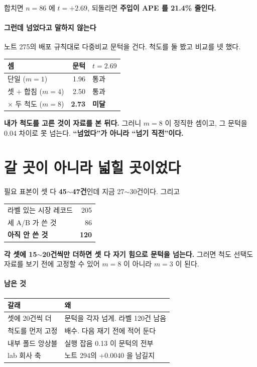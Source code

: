 \documentclass[10pt]{article}
\begin{document}
합치면 $n{=}86$ 에 $t{=}+2.69$, 되돌리면 \textbf{주입이 APE 를 21.4\% 줄인다.}

\paragraph{그런데 넘었다고 말하지 않는다} 노트 275의 배포 규칙대로 다중비교
문턱을 건다. 척도를 둘 봤고 비교를 넷 했다.

\begin{center}\small
\begin{tabular}{lrl}
\hline
셈 & 문턱 & $t{=}2.69$ \\
\hline
단일 ($m{=}1$) & 1.96 & 통과 \\
셋 $+$ 합침 ($m{=}4$) & 2.50 & 통과 \\
$\times$ 두 척도 ($m{=}8$) & \textbf{2.73} & \textbf{미달} \\
\hline
\end{tabular}
\end{center}

\textbf{내가 척도를 고른 것이 자료를 본 뒤다.} 그러니 $m{=}8$ 이 정직한
셈이고, 그 문턱을 0.04 차이로 못 넘는다. \textbf{``넘었다''가 아니라
``넘기 직전''이다.}

\section{갈 곳이 아니라 넓힐 곳이었다}

필요 표본이 셋 다 \textbf{45$\sim$47건}인데 지금 27$\sim$30건이다. 그리고

\begin{center}\small
\begin{tabular}{lr}
\hline
라벨 있는 시장 레코드 & 205 \\
세 A/B 가 쓴 것 & 86 \\
\textbf{아직 안 쓴 것} & \textbf{120} \\
\hline
\end{tabular}
\end{center}

\textbf{각 셋에 15$\sim$20건씩만 더하면 셋 다 자기 힘으로 문턱을 넘는다.}
그러면 척도 선택도 자료를 보기 전에 고정할 수 있어 $m{=}8$ 이 아니라
$m{=}3$ 이 된다.

\paragraph{남은 것}
\begin{center}\small
\begin{tabular}{ll}
\hline
갈래 & 왜 \\
\hline
셋에 20건씩 더 & 문턱을 각자 넘게. 라벨 120건 남음 \\
척도를 먼저 고정 & 배수. 다음 재기 전에 적어 둔다 \\
내부 폴드 앙상블 & 실행 잡음 0.13 이 문턱의 전부 \\
lab 회사 축 & 노트 294의 $+$0.0040 을 남길지 \\
\hline
\end{tabular}
\end{center}
\end{document}
